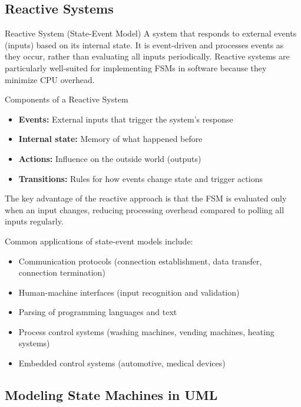 \subsection{Reactive Systems}

\begin{definition}{Reactive System (State-Event Model)}
A system that responds to external events (inputs) based on its internal state. It is event-driven and processes events as they occur, rather than evaluating all inputs periodically. Reactive systems are particularly well-suited for implementing FSMs in software because they minimize CPU overhead.
\end{definition}

\begin{concept}{Components of a Reactive System}
\begin{itemize}
    \item \textbf{Events:} External inputs that trigger the system's response
    \item \textbf{Internal state:} Memory of what happened before
    \item \textbf{Actions:} Influence on the outside world (outputs)
    \item \textbf{Transitions:} Rules for how events change state and trigger actions
\end{itemize}

The key advantage of the reactive approach is that the FSM is evaluated only when an input changes, reducing processing overhead compared to polling all inputs regularly.
\end{concept}

\begin{example}
Common applications of state-event models include:
\begin{itemize}
    \item Communication protocols (connection establishment, data transfer, connection termination)
    \item Human-machine interfaces (input recognition and validation)
    \item Parsing of programming languages and text
    \item Process control systems (washing machines, vending machines, heating systems)
    \item Embedded control systems (automotive, medical devices)
\end{itemize}
\end{example}

\subsection{Modeling State Machines in UML}

